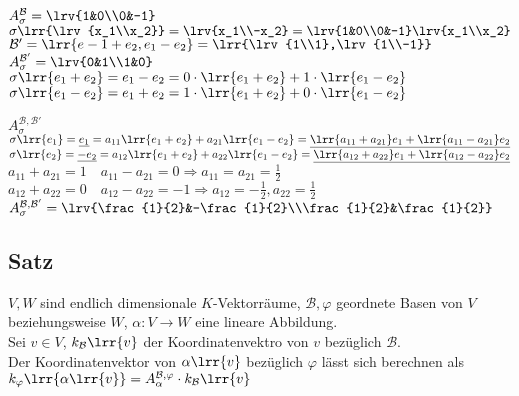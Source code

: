 			$A_{\sigma}^{\mathcal{B}}=\lrv{1&0\\0&-1}$\\
			$\sigma\lrr{\lrv{x_1\\x_2}}=\lrv{x_1\\-x_2}=\lrv{1&0\\0&-1}\lrv{x_1\\x_2}$\\
			$\mathcal{B}'=\lrr{e-1+e_2, e_1-e_2}=\lrr{\lrv{1\\1},\lrv{1\\-1}}$\\
			$A_\sigma^{\mathcal{B}'}=\lrv{0&1\\1&0}$\\
			$\sigma\lrr{e_1+e_2}=e_1-e_2=0\cdot\lrr{e_1+e_2}+1\cdot\lrr{e_1-e_2}$\\
			$\sigma\lrr{e_1-e_2}=e_1+e_2=1\cdot\lrr{e_1+e_2}+0\cdot\lrr{e_1-e_2}$

			$A_\sigma^{\mathcal{B},\mathcal{B}'}$\\
			$\sigma\lrr{e_1}=\underline{e_1}=a_{11}\lrr{e_1+e_2}+a_{21}\lrr{e_1-e_2}=\underline{\lrr{a_{11}+a_{21}}e_1+\lrr{a_{11}-a_{21}}e_2}$\\
			$\sigma\lrr{e_2}=\underline{-e_2}=a_{12}\lrr{e_1+e_2}+a_{22}\lrr{e_1-e_2}=\underline{\lrr{a_{12}+a_{22}}e_1+\lrr{a_{12}-a_{22}}e_2}$\\
			$a_{11}+a_{21}=1\quad a_{11}-a_{21}=0\Rightarrow a_{11}=a_{21}=\frac{1}{2}$\\
			$a_{12}+a_{22}=0\quad a_{12}-a_{22}=-1\Rightarrow a_{12}=-\frac{1}{2},a_{22}=\frac{1}{2}$\\
			$A_\sigma^{\mathcal{B},\mathcal{B}'}=\lrv{\frac{1}{2}&-\frac{1}{2}\\\frac{1}{2}&\frac{1}{2}}$
	\subExEnd

\subsection{Satz}
	$V,W$ sind endlich dimensionale $K$-Vektorräume, $\mathcal{B},\varphi$ geordnete Basen von $V$\\
	beziehungsweise $W$, $\alpha:V\rightarrow W$ eine lineare Abbildung.\\
	Sei $v\in V$, $k_{\mathcal{B}}\lrr{v}$ der Koordinatenvektro von $v$ bezüglich $\mathcal{B}$.\\
	Der Koordinatenvektor von $\alpha\lrr{v}$ bezüglich $\varphi$ lässt sich berechnen als\\
	$k_\varphi\lrr{\alpha\lrr{v}}=A_{\alpha}^{\mathcal{B},\varphi}\cdot k_\mathcal{B}\lrr{v}$


